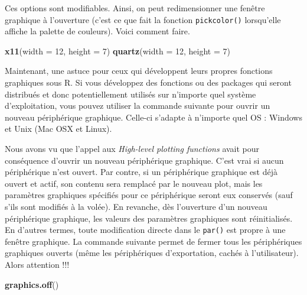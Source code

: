\documentclass[]{article}
\newenvironment{Shaded}{\begin{snugshade}}{\end{snugshade}}
\newcommand{\ControlFlowTok}[1]{\textcolor[rgb]{0.13,0.29,0.53}{\textbf{#1}}}
\newcommand{\DataTypeTok}[1]{\textcolor[rgb]{0.13,0.29,0.53}{#1}}
\newcommand{\DecValTok}[1]{\textcolor[rgb]{0.00,0.00,0.81}{#1}}
\newcommand{\KeywordTok}[1]{\textcolor[rgb]{0.13,0.29,0.53}{\textbf{#1}}}
\newcommand{\NormalTok}[1]{#1}
\newcommand{\OperatorTok}[1]{\textcolor[rgb]{0.81,0.36,0.00}{\textbf{#1}}}
\begin{document}
Ces options sont modifiables. Ainsi, on peut redimensionner une fenêtre graphique à l'ouverture (c'est ce que fait la fonction \texttt{pickcolor()} lorsqu'elle affiche la palette de couleurs). Voici comment faire.

\begin{Shaded}
\begin{Highlighting}[]
\KeywordTok{x11}\NormalTok{(}\DataTypeTok{width =} \DecValTok{12}\NormalTok{, }\DataTypeTok{height =} \DecValTok{7}\NormalTok{)}
\KeywordTok{quartz}\NormalTok{(}\DataTypeTok{width =} \DecValTok{12}\NormalTok{, }\DataTypeTok{height =} \DecValTok{7}\NormalTok{)}
\end{Highlighting}
\end{Shaded}

Maintenant, une astuce pour ceux qui développent leurs propres fonctions graphiques sous R. Si vous développez des fonctions ou des packages qui seront distribués et donc potentiellement utilisés sur n'importe quel système d'exploitation, vous pouvez utiliser la commande suivante pour ouvrir un nouveau périphérique graphique. Celle-ci s'adapte à n'importe quel OS : Windows et Unix (Mac OSX et Linux).

\begin{Shaded}
\end{Shaded}

Nous avons vu que l'appel aux \emph{High-level plotting functions} avait pour conséquence d'ouvrir un nouveau périphérique graphique. C'est vrai si aucun périphérique n'est ouvert. Par contre, si un périphérique graphique est déjà ouvert et actif, son contenu sera remplacé par le nouveau plot, mais les paramètres graphiques spécifiés pour ce périphérique seront eux conservés (sauf s'ils sont modifiés à la volée). En revanche, dès l'ouverture d'un nouveau périphérique graphique, les valeurs des paramètres graphiques sont réinitialisés. En d'autres termes, toute modification directe dans le \texttt{par()} est propre à une fenêtre graphique.
La commande suivante permet de fermer tous les périphériques graphiques ouverts (même les périphériques d'exportation, cachés à l'utilisateur). Alors attention !!!

\begin{Shaded}
\begin{Highlighting}[]
\KeywordTok{graphics.off}\NormalTok{()}
\end{Highlighting}
\end{Shaded}
\end{document}

